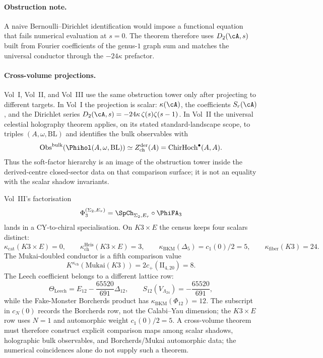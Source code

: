 \begin{remark}
\paragraph{Obstruction note.}
A naive Bernoulli--Dirichlet identification would impose a functional
equation that fails numerical evaluation at $s = 0$. The theorem
therefore uses
$D_2(\cA, s)$ built from Fourier coefficients of the genus-$1$
graph sum and matches the universal conductor through the
$-24\kappa$ prefactor.

\paragraph{Cross-volume projections.}
Vol~I, Vol~II, and Vol~III use the same obstruction tower only after
projecting to different targets. In Vol~I the projection is scalar:
$\kappa(\cA)$, the coefficients $S_r(\cA)$, and the Dirichlet series
$D_2(\cA,s)=-24\kappa\,\zeta(s)\zeta(s-1)$. In Vol~II the universal
celestial holography theorem applies, on its stated standard-landscape
scope, to triples $(A,\omega,\mathrm{BL})$ and identifies the bulk
observables with
\[
 \mathrm{Obs}^{\mathrm{bulk}}(\Phihol(A,\omega,\mathrm{BL}))
 \simeq
 Z^{\mathrm{der}}_{\mathrm{ch}}(A)
 =
 \mathrm{ChirHoch}^{\bullet}(A,A).
\]
Thus the soft-factor hierarchy is an image of the obstruction tower
inside the derived-centre closed-sector data on that comparison
surface; it is not an equality with the scalar shadow invariants.

Vol~III's factorisation
\[
 \Phi_3^{(\Sigma_2,E_\tau)}=\SpCh_{\Sigma_2,E_\tau}\circ\PhiFA_3
\]
lands in a CY-to-chiral specialisation. On $K3\times E$ the census
keeps four scalars distinct:
\[
 \kappa_{\mathrm{cat}}(K3\times E)=0,\qquad
 \kappa_{\mathrm{ch}}^{\mathrm{Heis}}(K3\times E)=3,\qquad
 \kappa_{\mathrm{BKM}}(\Delta_5)=c_1(0)/2=5,\qquad
 \kappa_{\mathrm{fiber}}(K3)=24.
\]
The Mukai-doubled conductor is a fifth comparison value
\[
 K^{\kappa_{\mathrm{ch}}}(\mathrm{Mukai}(K3))
 =2c_+(\mathrm{II}_{4,20})=8.
\]
The Leech coefficient belongs to a different lattice row:
\[
 \Theta_{\mathrm{Leech}}
 =E_{12}-\frac{65520}{691}\Delta_{12},\qquad
 S_{12}(V_{\Lambda_{24}})=-\frac{65520}{691},
\]
while the Fake-Monster Borcherds product has
$\kappa_{\mathrm{BKM}}(\Phi_{12})=12$. The subscript in $c_N(0)$
records the Borcherds row, not the Calabi--Yau dimension; the
$K3\times E$ row uses $N=1$ and automorphic weight $c_1(0)/2=5$.
A cross-volume theorem must therefore construct explicit comparison
maps among scalar shadows, holographic bulk observables, and
Borcherds/Mukai automorphic data; the numerical coincidences alone do
not supply such a theorem.
\end{remark}


